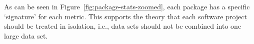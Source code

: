 As can be seen in Figure~\ref{fig:package-stats-zoomed}, each package has a specific `signature' for each metric. This supports the theory that each software project should be treated in isolation, i.e., data sets should not be combined into one large data set.

